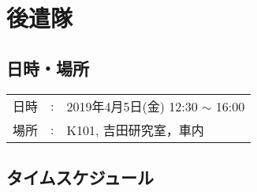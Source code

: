 %

\section{後遣隊}

\subsection{日時・場所}

\begin{tabular}{p{}rp{}}
  日時 & : & 2019年4月5日(金) 12:30 $\sim$ 16:00\\
  場所 & : & K101, 吉田研究室，車内
\end{tabular}

\subsection{タイムスケジュール}

